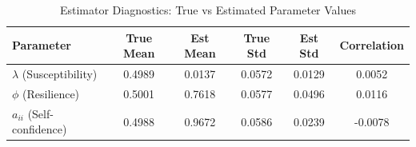 
\begin{table}[H]
\centering
\caption{Estimator Diagnostics: True vs Estimated Parameter Values}
\label{tab:estimator_diagnostics}
\begin{tabular}{lccccc}
\hline
\textbf{Parameter} & \textbf{True Mean} & \textbf{Est Mean} & \textbf{True Std} & \textbf{Est Std} & \textbf{Correlation} \\
\hline
$\lambda$ (Susceptibility) & 0.4989 & 0.0137 & 0.0572 & 0.0129 & 0.0052 \\
$\phi$ (Resilience) & 0.5001 & 0.7618 & 0.0577 & 0.0496 & 0.0116 \\
$a_{ii}$ (Self-confidence) & 0.4988 & 0.9672 & 0.0586 & 0.0239 & -0.0078 \\
\hline
\end{tabular}
\end{table}
